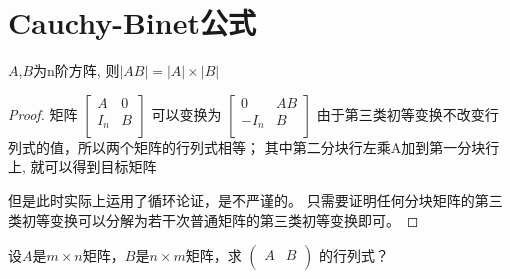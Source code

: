 \section{Cauchy-Binet公式}
\begin{theorem}{}{}
$A$,$B$为n阶方阵, 则$|AB|=|A|\times|B|$
\end{theorem}
\begin{proof}{}{}
矩阵
$\begin{bmatrix}
A & 0 \\
I_n & B \\
\end{bmatrix}$ 
可以变换为
$\begin{bmatrix}
0 & AB \\
-I_n & B \\
\end{bmatrix}$
由于第三类初等变换不改变行列式的值，所以两个矩阵的行列式相等；
其中第二分块行左乘A加到第一分块行上, 就可以得到目标矩阵

但是此时实际上运用了循环论证，是不严谨的。
只需要证明任何分块矩阵的第三类初等变换可以分解为若干次普通矩阵的第三类初等变换即可。
\end{proof}

设$A$是$m\times n$矩阵，$B$是$n\times m$矩阵，求
$\begin{pmatrix}
A & B \\
\end{pmatrix}$
的行列式？

